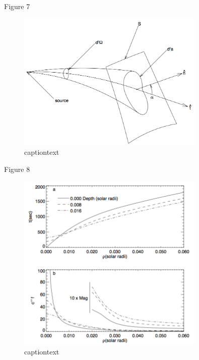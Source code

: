 \documentclass{beamer}
\begin{document}
\begin{frame}{Figure 7}
    \begin{figure}
        \includegraphics[width=0.8\textwidth]{fig_7.png}
        \caption{captiontext}
    \end{figure}
\end{frame}

\begin{frame}{Figure 8}
    \begin{figure}
        \includegraphics[width=0.8\textwidth]{fig_8.png}
        \caption{captiontext}
    \end{figure}
\end{frame}
\end{document}
